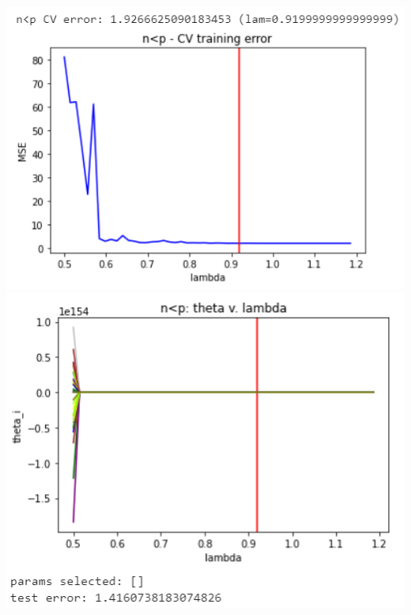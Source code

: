 \documentclass[11pt]{article}
\begin{document}
\begin{center}
\includegraphics[scale=0.7]{charts/ridge_q_corr_n_lt_p_err.PNG}
\includegraphics[scale=0.7]{charts/ridge_q_corr_n_lt_p_thetas.PNG}


\end{center}
\end{document}
